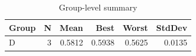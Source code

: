 \begin{table}[htbp]
\centering
\caption{Group-level summary}
\label{tab:group-summary}
\begin{tabular}{lrrrrr}
\toprule
\textbf{Group} & \textbf{N} & \textbf{Mean} & \textbf{Best} & \textbf{Worst} & \textbf{StdDev} \\
\midrule
D & 3 & 0.5812 & 0.5938 & 0.5625 & 0.0135 \\
\bottomrule
\end{tabular}
\end{table}